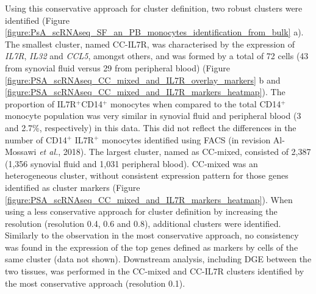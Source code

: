 Using this conservative approach for cluster definition, two robust clusters were identified (Figure \ref{figure:PsA_scRNAseq_SF_an_PB_monocytes_identification_from_bulk} a). The smallest cluster, named CC-IL7R, was characterised by the expression of \textit{IL7R}, \textit{IL32} and \textit{CCL5}, amongst others, and was formed by a total of 72 cells (43 from synovial fluid versus 29 from peripheral blood) (Figure \ref{figure:PSA_scRNAseq_CC_mixed_and_IL7R_overlay_markers} b and \ref{figure:PSA_scRNAseq_CC_mixed_and_IL7R_markers_heatmap}). The proportion of IL7R$^+$CD14$^+$ monocytes when compared to the total CD14$^+$ monocyte population was very similar in synovial fluid and peripheral blood (3 and 2.7\%, respectively) in this data. This did not reflect the differences in the number of CD14$^+$ IL7R$^+$ monocytes identified using FACS (in revision Al-Mossawi \textit{et al.}, 2018). The largest cluster, named as CC-mixed, consisted of 2,387 (1,356 synovial fluid and 1,031 peripheral blood). CC-mixed was an heterogeneous cluster, without consistent expression pattern for those genes identified as cluster markers (Figure \ref{figure:PSA_scRNAseq_CC_mixed_and_IL7R_markers_heatmap}). When using a less conservative approach for cluster definition by increasing the resolution (resolution 0.4, 0.6 and 0.8), additional clusters were identified. Similarly to the observation in the most conservative approach, no consistency was found in the expression of the top genes defined as markers by cells of the same cluster (data not shown). Downstream analysis, including DGE between the two tissues, was performed in the CC-mixed and CC-IL7R clusters identified by the most conservative approach (resolution 0.1).




